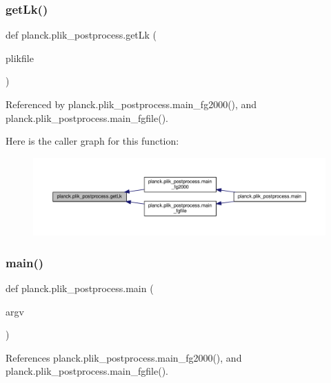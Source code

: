 \subsubsection{\texorpdfstring{get\+Lk()}{getLk()}}
{\footnotesize\ttfamily def planck.\+plik\+\_\+postprocess.\+get\+Lk (\begin{DoxyParamCaption}\item[{}]{plikfile }\end{DoxyParamCaption})}



Referenced by planck.\+plik\+\_\+postprocess.\+main\+\_\+fg2000(), and planck.\+plik\+\_\+postprocess.\+main\+\_\+fgfile().

Here is the caller graph for this function\+:
\nopagebreak
\begin{figure}[H]
\begin{center}
\leavevmode
\includegraphics[width=350pt]{namespaceplanck_1_1plik__postprocess_a1134321ac736e3fb7a99ad4754a563dd_icgraph}
\end{center}
\end{figure}
\mbox{\label{namespaceplanck_1_1plik__postprocess_a9ebb24e486ebd883116b6b49356dea52}} 
\subsubsection{\texorpdfstring{main()}{main()}}
{\footnotesize\ttfamily def planck.\+plik\+\_\+postprocess.\+main (\begin{DoxyParamCaption}\item[{}]{argv }\end{DoxyParamCaption})}



References planck.\+plik\+\_\+postprocess.\+main\+\_\+fg2000(), and planck.\+plik\+\_\+postprocess.\+main\+\_\+fgfile().

